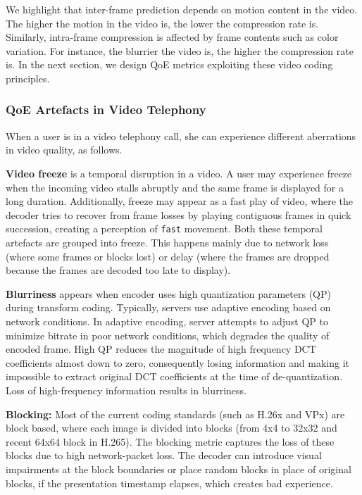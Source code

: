 We highlight that inter-frame prediction depends on motion content in the video. The higher the motion in the video is, the lower the compression rate is. Similarly, intra-frame compression is affected by frame contents such as color variation. For instance, the blurrier the video is, the higher the compression rate is. In the next section, we design QoE metrics exploiting these video coding principles.

\subsubsection{QoE Artefacts in Video Telephony}

When a user is in a video telephony call, she can experience different aberrations in video quality, as follows.

\noindent \textbf{Video freeze} is a temporal disruption in a video. A user may experience freeze when the incoming video stalls abruptly and the same frame is displayed for a long duration. Additionally, freeze may appear as a fast play of video, where the decoder tries to recover from frame losses by playing contiguous frames in quick succession, creating a perception of \texttt{fast} movement. Both these temporal artefacts are grouped into freeze. 
This happens mainly due to network loss (where some frames or blocks lost) or delay (where the frames are dropped because the frames are decoded too late to display). 

\noindent \textbf{Blurriness} appears when encoder uses high quantization parameters (QP) during transform coding. Typically, servers use adaptive encoding based on network conditions. In adaptive encoding, server attempts to adjust QP to minimize bitrate in poor network conditions, which degrades the quality of encoded frame. High QP reduces the magnitude of high frequency DCT coefficients almost down to zero, consequently losing information and making it impossible to extract original DCT coefficients at the time of de-quantization.  Loss of high-frequency information results in blurriness. 

\noindent \textbf{Blocking:} Most of the current coding standards (such as H.26x and VPx) are block based, where each image is divided into blocks (from 4x4 to 32x32 and recent 64x64 block in H.265). The blocking metric captures the loss of these blocks due to high network-packet loss. The decoder can introduce visual impairments at the block boundaries or place random blocks in place of original blocks, if the presentation timestamp elapses, which creates bad experience. 

